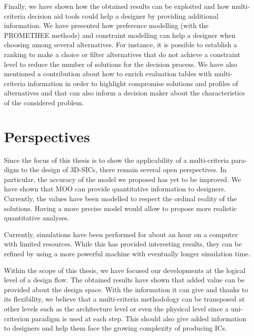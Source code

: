 Finally, we have shown how the obtained results can be exploited and how multi-criteria decision aid tools could help a designer by providing additional information. We have presented how preference modelling (with the PROMETHEE methods) and constraint modelling can help a designer when choosing among several alternatives. For instance, it is possible to establish a ranking to make a choice or filter alternatives that do not achieve a constraint level to reduce the number of solutions for the decision process. We have also mentioned a contribution about how to enrich evaluation tables with multi-criteria information in order to highlight compromise solutions and profiles of alternatives and that can also inform a decision maker about the characteristics of the considered problem. %

\section*{Perspectives}

Since the focus of this thesis is to show the applicability of a multi-criteria para\hyp{}digm to the design of 3D-SICs, there remain several open perspectives. In particular, the accuracy of the model we proposed has yet to be improved. We have shown that MOO can provide quantitative information to designers. Currently, the values have been modelled to respect the ordinal reality of the solutions. Having a more precise model would allow to propose more realistic quantitative analyses.

Currently, simulations have been performed for about an hour on a computer with limited resources. While this has provided interesting results, they can be refined by using a more powerful machine with eventually longer simulation time.

Within the scope of this thesis, we have focused our developments at the logical level of a design flow. The obtained results have shown that added value can be provided about the design space. With the information it can give and thanks to its flexibility, we believe that a multi-criteria methodology can be transposed at other levels such as the architecture level or even the physical level since a uni-criterion paradigm is used at each step. This should also give added information to designers and help them face the growing complexity of producing ICs.

